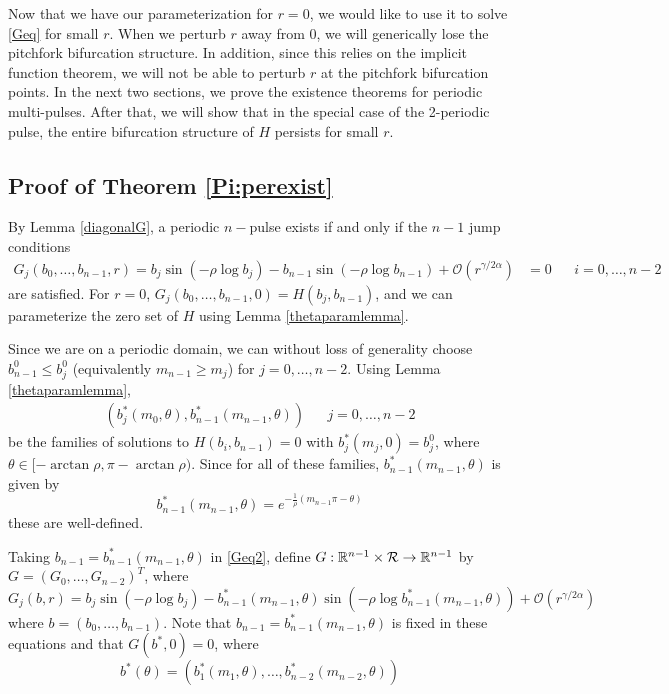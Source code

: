\documentclass[thesis.tex]{subfiles}
\begin{document}
Now that we have our parameterization for $r = 0$, we would like to use it to solve \eqref{Geq} for small $r$. When we perturb $r$ away from 0, we will generically lose the pitchfork bifurcation structure. In addition, since this relies on the implicit function theorem, we will not be able to perturb $r$ at the pitchfork bifurcation points. In the next two sections, we prove the existence theorems for periodic multi-pulses. After that, we will show that in the special case of the 2-periodic pulse, the entire bifurcation structure of $H$ persists for small $r$.

\subsection{Proof of Theorem \ref{Pi:perexist}}

By Lemma \ref{diagonalG}, a periodic $n-$pulse exists if and only if the $n-1$ jump conditions
\begin{align}\label{Geq2}
G_j(b_0, \dots, b_{n-1}, r) = b_j \sin \left( -\rho \log b_j \right) - b_{n-1} \sin \left( -\rho \log b_{n-1} \right) + \mathcal{O}(r^{\gamma / 2 \alpha}) &= 0 && i = 0, \dots, n-2
\end{align}
are satisfied. For $r = 0$, $G_j(b_0, \dots, b_{n-1}, 0) = H(b_j, b_{n-1})$, and we can parameterize the zero set of $H$ using Lemma \ref{thetaparamlemma}. 

Since we are on a periodic domain, we can without loss of generality choose $b_{n-1}^0 \leq b_j^0$ (equivalently $m_{n-1} \geq m_j$) for $j = 0, \dots, n-2$. Using Lemma \ref{thetaparamlemma}, 
\begin{align*}
(b_j^*(m_0, \theta), b_{n-1}^*(m_{n-1}, \theta)) && j = 0, \dots, n-2
\end{align*}
be the families of solutions to $H(b_i, b_{n-1}) = 0$ with $b_j^*(m_j, 0) = b_j^0$, where $\theta \in [-\arctan \rho, \pi - \arctan \rho)$. Since for all of these families, $b_{n-1}^*(m_{n-1}, \theta)$ is given by
\begin{equation}\label{bstarlast}
b_{n-1}^*(m_{n-1}, \theta) = e^{-\frac{1}{\rho}(m_{n-1}\pi - \theta)}
\end{equation}
these are well-defined. 

Taking $b_{n-1} = b_{n-1}^*(m_{n-1}, \theta)$ in \eqref{Geq2}, define $G: {\mathbb R}^{n-1} \times \mathcal{R} \rightarrow {\mathbb R}^{n-1}$ by $G = (G_0, \dots, G_{n-2})^T$, where 
\begin{equation*}
G_j(b, r) = b_j \sin \left( -\rho \log b_j \right) - b_{n-1}^*(m_{n-1}, \theta) \sin \left( -\rho \log b_{n-1}^*(m_{n-1}, \theta) \right) + \mathcal{O}(r^{\gamma / 2 \alpha})
\end{equation*}
where $b = (b_0, \dots, b_{n-1})$. Note that $b_{n-1} = b_{n-1}^*(m_{n-1}, \theta)$ is fixed in these equations and that $G(b^*, 0) = 0$,
where
\[
b^*(\theta) = \left( b_1^*(m_1, \theta), \dots, b_{n-2}^*(m_{n-2}, \theta) \right)
\]
\end{document}
